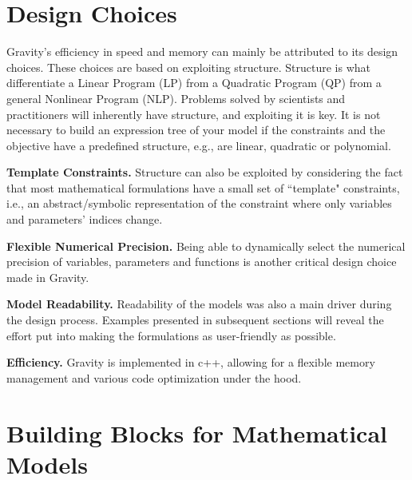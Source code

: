 \documentclass{article}
\newcommand{\Gravity}{{\sc Gravity}}
\begin{document}
\section{Design Choices}
\Gravity{}'s efficiency in speed and memory can mainly be attributed to its design choices. These choices are based on exploiting structure. Structure is what differentiate a Linear Program (LP) from a Quadratic Program (QP) from a general Nonlinear Program (NLP). Problems solved by scientists and practitioners will inherently have structure, and exploiting it is key. It is not necessary to build an expression tree of your model if the constraints and the objective have a predefined structure, e.g., are linear, quadratic or polynomial. 

{\bf Template Constraints.} Structure can also be exploited by considering the fact that most mathematical formulations have a small set of ``template" constraints, i.e., an abstract/symbolic representation of the constraint where only variables and parameters' indices change.

{\bf Flexible Numerical Precision.} Being able to dynamically  select the numerical precision of variables, parameters and functions is another critical design choice made in \Gravity{}.

{\bf Model Readability.} Readability of the models was also a main driver during the design process. Examples presented in subsequent sections will reveal the effort put into making the formulations as user-friendly as possible.

{\bf Efficiency.}
Gravity is implemented in c++, allowing for a flexible memory management and various code optimization under the hood.

\section{Building Blocks for Mathematical Models}
\end{document}
